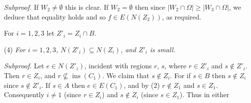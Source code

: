 \textit{Subproof.} If $W_2 \ne \emptyset$ this is clear. If $W_2 = \emptyset$ then since $|W_2 \cap \Omega| \ge |W_3 \cap \Omega|$, we deduce that equality holds and so $f \in E(N(Z_2))$, as required.

For $i = 1, 2, 3$ let $Z'_i = Z_i \cap B$.

\hspace*{12pt}(4) \textit{For $i = 1, 2, 3$, $N(Z'_i) \subseteq N(Z_i)$, and $Z'_i$ is small.}

\textit{Subproof.} Let $e \in N(Z'_i)$, incident with regions $r$, $s$, where $r \in Z'_i$ and $s \notin Z'_i$. Then $r \in Z_i$, and $r \not\subseteq \operatorname{ins}(C_1)$. We claim that $s \notin Z_i$. For if $s \in B$ then $s \notin Z_i$ since $s \notin Z'_i$. If $s \in A$ then $e \in E(C_1)$, and by (2) $r \notin Z_1$ and $s \in Z_1$. Consequently $i \ne 1$ (since $r \in Z_i$) and $s \notin Z_i$ (since $s \in Z_1$). Thus in either
